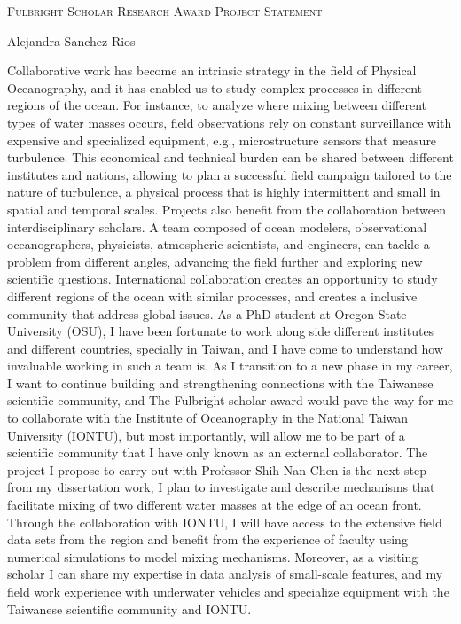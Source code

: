 \documentclass[letterpaper, 12pt ]{article}
\newcommand{\soptitle}{Fulbright Scholar Research Award Project Statement}
\newcommand{\yourname}{Alejandra Sanchez-Rios}
\begin{document}
\begin{center}{\Large \scshape \soptitle}\end{center}
\begin{center}\vspace{0.2em} { \yourname\\}
\end{center}


Collaborative work has become an intrinsic strategy in the field of Physical Oceanography, and it has enabled us to study complex processes in different regions of the ocean. For instance, to analyze where mixing between different types of water masses occurs, field observations rely on constant surveillance with expensive and specialized equipment, e.g., microstructure sensors that measure turbulence. This economical and technical burden can be shared between different institutes and nations, allowing to plan a successful field campaign tailored to the nature of turbulence, a physical process that is highly intermittent and small in spatial and temporal scales. Projects also benefit from the collaboration between interdisciplinary scholars. A team composed of ocean modelers, observational oceanographers, physicists, atmospheric scientists, and engineers, can tackle a problem from different angles, advancing the field further and exploring new scientific questions. International collaboration creates an opportunity to study different regions of the ocean with similar processes, and creates a inclusive community that address global issues. As a PhD student at Oregon State University (OSU), I have been fortunate to work along side different institutes and different countries, specially in Taiwan, and I have come to understand how invaluable working in such a team is. As I transition to a new phase in my career, I want to continue building and strengthening connections with the Taiwanese scientific community, and The Fulbright scholar award would pave the way for me to collaborate with the Institute of Oceanography in the National Taiwan University (IONTU), but most importantly, will allow me to be part of a scientific community that I have only known as an external collaborator. The project I propose to carry out with Professor Shih-Nan Chen is the next step from my dissertation work; I plan to investigate and describe mechanisms that facilitate mixing of two different water masses at the edge of an ocean front. Through the collaboration with IONTU, I will have access to the extensive field data sets from the region and benefit from the experience of faculty using numerical simulations to model mixing mechanisms. Moreover, as a visiting scholar I can share my expertise in data analysis of small-scale features, and my field work experience with underwater vehicles and specialize equipment with the Taiwanese scientific community and IONTU. 
\end{document}
